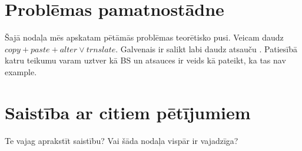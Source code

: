 \section{Problēmas pamatnostādne}
Šajā nodaļa mēs apskatam pētāmās problēmas teorētisko pusi.
Veicam daudz $copy + paste + alter \vee trnslate$.
Galvenais ir salikt labi daudz atsauču \cite{kant2018recent}.
Patiesībā katru teikumu varam uztver kā BS un atsauces ir veids kā pateikt, ka tas nav \gls{example}.

\section{Saistība ar citiem pētījumiem}

Te vajag aprakstīt saistību?
Vai šāda nodaļa vispār ir vajadzīga?